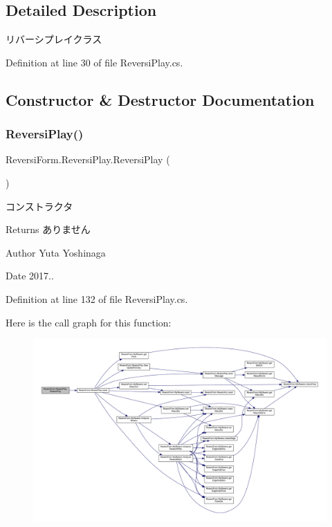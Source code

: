 \subsection{Detailed Description}
リバーシプレイクラス 

Definition at line 30 of file Reversi\+Play.\+cs.



\subsection{Constructor \& Destructor Documentation}
\mbox{\label{class_reversi_form_1_1_reversi_play_aeb78112f8fb7fd2c75b8e0f088939867}} 
\subsubsection{\texorpdfstring{Reversi\+Play()}{ReversiPlay()}}
{\footnotesize\ttfamily Reversi\+Form.\+Reversi\+Play.\+Reversi\+Play (\begin{DoxyParamCaption}{ }\end{DoxyParamCaption})}



コンストラクタ 

\begin{DoxyReturn}{Returns}
ありません 
\end{DoxyReturn}
\begin{DoxyAuthor}{Author}
Yuta Yoshinaga 
\end{DoxyAuthor}
\begin{DoxyDate}{Date}
2017.. 
\end{DoxyDate}


Definition at line 132 of file Reversi\+Play.\+cs.

Here is the call graph for this function\+:
\nopagebreak
\begin{figure}[H]
\begin{center}
\leavevmode
\includegraphics[width=350pt]{class_reversi_form_1_1_reversi_play_aeb78112f8fb7fd2c75b8e0f088939867_cgraph}
\end{center}
\end{figure}


